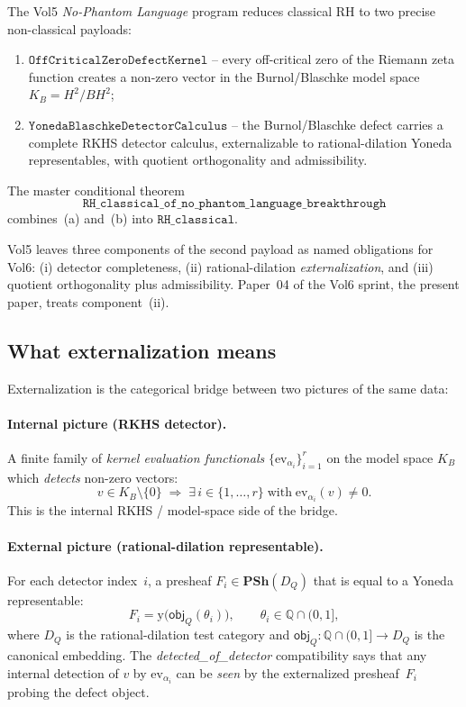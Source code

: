 \documentclass[12pt]{article}
\theoremstyle{plain}
\theoremstyle{definition}
\theoremstyle{remark}
\newcommand{\KB}{K_{B}}
\newcommand{\HardyTwo}{H^{2}}
\newcommand{\Rationals}{\mathbb{Q}}
\newcommand{\Yon}{\mathrm{y}}
\newcommand{\PSh}{\mathbf{PSh}}
\newcommand{\DQ}{D_{Q}}
\newcommand{\objQ}{\mathsf{obj}_{Q}}
\begin{document}
The Vol5 \emph{No-Phantom Language} program reduces classical RH to two
precise non-classical payloads:
\begin{enumerate}[label=(\alph*)]
  \item $\texttt{OffCriticalZeroDefectKernel}$ -- every off-critical
    zero of the Riemann zeta function creates a non-zero vector in the
    Burnol/Blaschke model space $\KB = \HardyTwo / B\HardyTwo$;
  \item $\texttt{YonedaBlaschkeDetectorCalculus}$ -- the Burnol/Blaschke
    defect carries a complete RKHS detector calculus, externalizable
    to rational-dilation Yoneda representables, with quotient
    orthogonality and admissibility.
\end{enumerate}
The master conditional theorem
\[
  \texttt{RH\_classical\_of\_no\_phantom\_language\_breakthrough}
\]
combines~(a) and~(b) into $\texttt{RH\_classical}$.

Vol5 leaves three components of the second payload as named obligations
for Vol6: (i) detector completeness, (ii) rational-dilation
\emph{externalization}, and (iii) quotient orthogonality plus
admissibility.  Paper~04 of the Vol6 sprint, the present paper, treats
component~(ii).

\subsection{What externalization means}

Externalization is the categorical bridge between two pictures of the
same data:

\paragraph{Internal picture (RKHS detector).}
A finite family of \emph{kernel evaluation functionals}
$\{\mathrm{ev}_{\alpha_i}\}_{i=1}^{r}$ on the model space $\KB$ which
\emph{detects} non-zero vectors:
\[
  v\in\KB\setminus\{0\}\;\Longrightarrow\;
  \exists\, i\in\{1,\dots,r\}\;\text{with}\;\mathrm{ev}_{\alpha_i}(v)\neq 0.
\]
This is the internal RKHS / model-space side of the bridge.

\paragraph{External picture (rational-dilation representable).}
For each detector index~$i$, a presheaf $F_i\in\PSh(\DQ)$ that is
equal to a Yoneda representable:
\[
  F_i = \Yon\bigl(\objQ(\theta_i)\bigr),\qquad
  \theta_i\in\Rationals\cap (0,1],
\]
where $\DQ$ is the rational-dilation test category and $\objQ\colon
\Rationals\cap(0,1]\to\DQ$ is the canonical embedding.  The
\emph{detected\_of\_detector} compatibility says that any internal
detection of $v$ by $\mathrm{ev}_{\alpha_i}$ can be \emph{seen} by the
externalized presheaf~$F_i$ probing the defect object.
\end{document}
